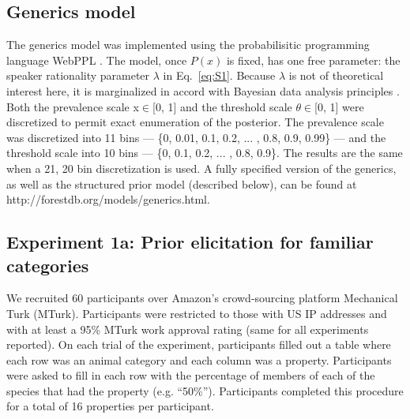 \documentclass{pnastwo}
\begin{document}
\begin{article}
\begin{materials}
\subsection{Generics model}
The generics model was implemented using the probabilisitic programming language WebPPL \cite{dippl}. 
The model, once $P(x)$ is fixed, has one free parameter: the speaker rationality parameter $\lambda$ in Eq.~\ref{eq:S1}. 
Because $\lambda$ is not of theoretical interest here, it is marginalized in accord with Bayesian data analysis principles \cite{LW2014}.
Both the prevalence scale x$\in$[0, 1]  and the threshold scale $\theta \in$[0, 1] were discretized to permit exact enumeration of the posterior.
The prevalence scale was discretized into 11 bins --- \{0, 0.01, 0.1, 0.2, ... , 0.8, 0.9, 0.99\} --- and the threshold scale into 10 bins ---  \{0, 0.1, 0.2, ... , 0.8, 0.9\}. 
The results are the same when a 21, 20 bin discretization is used. 
A fully specified version of the generics, as well as the structured prior model (described below), can be found at http://forestdb.org/models/generics.html. 


\subsection{Experiment 1a: Prior elicitation for familiar categories}
We recruited 60 participants over Amazon's crowd-sourcing platform Mechanical Turk (MTurk).  
Participants were restricted to those with US IP addresses and with at least a 95\% MTurk work approval rating (same for all experiments reported). 
On each trial of the experiment, participants filled out a table where each row was an animal category and each column was a property. 
Participants were asked to fill in each row with the percentage of members of each of the species that had the property (e.g. ``50\%'').
Participants completed this procedure for a total of 16 properties per participant.


\end{materials}
\end{article}
\end{document}
